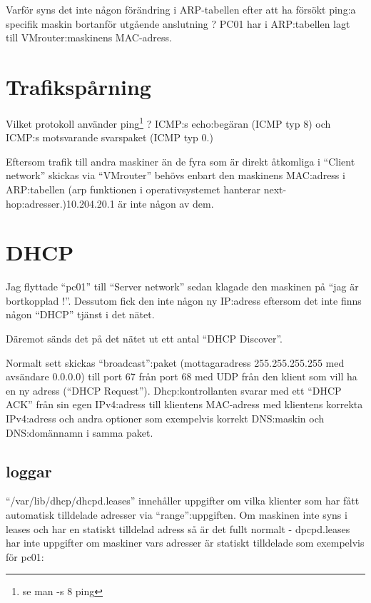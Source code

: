 \documentclass[swedish,10pt,a4paper]{article}
\begin{document}
Varför syns det inte någon förändring i ARP-tabellen efter att
ha försökt ping:a specifik maskin bortanför utgående anslutning ?
PC01 har i ARP:tabellen lagt till VMrouter:maskinens MAC-adress.

\section{Trafikspårning}
\label{sec:wireshark_usage}

Vilket protokoll använder ping\footnote{se man -s 8 ping} ? ICMP:s echo:begäran (ICMP typ 8) och ICMP:s motsvarande svarspaket (ICMP typ 0.)

Eftersom trafik till andra maskiner än de fyra som är direkt åtkomliga i ``Client network'' skickas via
``VMrouter'' behövs enbart den maskinens MAC:adress i ARP:tabellen (arp funktionen i operativsystemet hanterar
next-hop:adresser.)\@10.204.20.1 är inte någon av dem.

\section{DHCP}
\label{sec:dhcp_konf}

Jag flyttade ``pc01'' till  ``Server network'' sedan klagade den maskinen på ``jag är bortkopplad !''.
Dessutom fick den inte någon ny IP:adress eftersom det inte finns någon ``DHCP'' tjänst i det nätet.

Däremot sänds det på det nätet ut ett antal ``DHCP Discover''.

Normalt sett skickas ``broadcast'':paket (mottagaradress 255.255.255.255 med avsändare 0.0.0.0) till port 67 från port 68 med UDP från
den klient som vill ha en ny adress (``DHCP Request''). Dhcp:kontrollanten svarar med ett ``DHCP ACK'' från sin
egen IPv4:adress till klientens MAC-adress med klientens korrekta IPv4:adress och andra optioner som exempelvis
korrekt DNS:maskin och DNS:domännamn i samma paket.



\subsection{loggar}

``/var/lib/dhcp/dhcpd.leases'' innehåller uppgifter om vilka klienter som har fått
automatisk tilldelade adresser via ``range'':uppgiften. Om maskinen inte syns i leases och
har en statiskt tilldelad adress så är det fullt normalt - dpcpd.leases har inte
uppgifter om maskiner vars adresser är statiskt tilldelade
som exempelvis för pc01:
\end{document}
